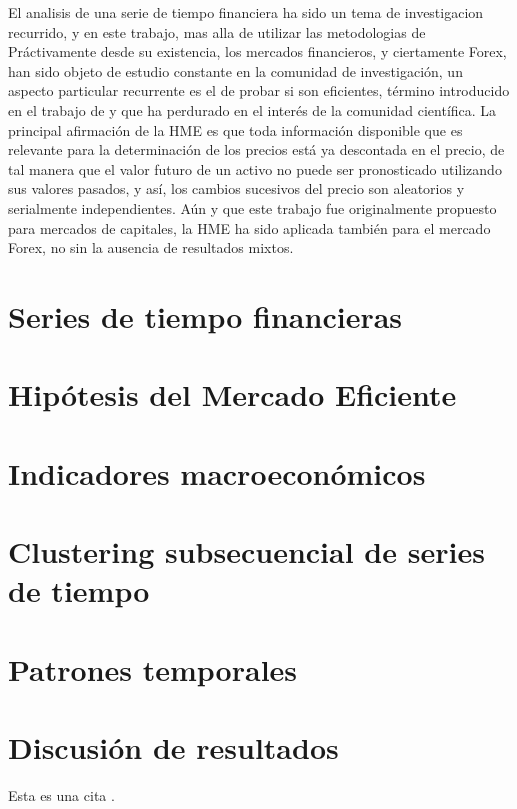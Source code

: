 \documentclass{article}\usepackage[]{graphicx}\usepackage[]{color}
\begin{document}
El analisis de una serie de tiempo financiera ha sido un tema de investigacion recurrido, y en este trabajo,
mas alla de utilizar las metodologias de
\\

Pr\'activamente desde su existencia, los mercados financieros, y ciertamente Forex, han sido objeto de estudio
constante en la comunidad de investigaci\'on, un aspecto particular recurrente es el de probar si son
eficientes, t\'ermino introducido en el trabajo de \cite{Fama1696} y que ha perdurado en el inter\'es de la
comunidad cient\'ifica. La principal afirmaci\'on de la HME es que toda informaci\'on disponible que es
relevante para la determinaci\'on de los precios est\'a ya descontada en el precio, de tal manera que el
valor futuro de un activo no puede ser pronosticado utilizando sus valores pasados, y as\'i, los cambios
sucesivos del precio son aleatorios y serialmente independientes. A\'un y que este trabajo fue originalmente
propuesto para mercados de capitales, la HME ha sido aplicada tambi\'en para el mercado Forex, no sin
la ausencia de resultados mixtos.



\section{Series de tiempo financieras}
\label{sec_series}

\section{Hip\'otesis del Mercado Eficiente}
\label{sec_hme}

\section{Indicadores macroecon\'omicos}
\label{sec_im}

\section{Clustering subsecuencial de series de tiempo}
\label{sec_clustering}

\section{Patrones temporales}
\label{sec_patrones}

\section{Discusi\'on de resultados}
\label{sec_resultados}

Esta es una cita \cite{majumder2017}.


\end{document}
